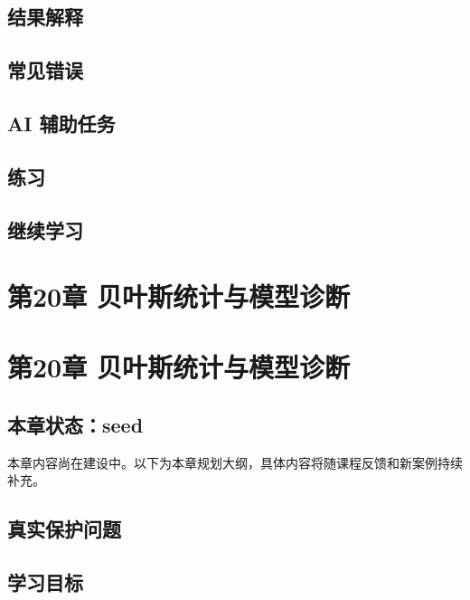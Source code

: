 \documentclass[
  letterpaper,
]{scrbook}
\begin{document}
\section{结果解释}\label{ux7ed3ux679cux89e3ux91ca-8}

\section{常见错误}\label{ux5e38ux89c1ux9519ux8bef-16}

\section{AI 辅助任务}\label{ai-ux8f85ux52a9ux4efbux52a1-9}

\section{练习}\label{ux7ec3ux4e60-18}

\section{继续学习}\label{ux7ee7ux7eedux5b66ux4e60-9}

\chapter{第20章
贝叶斯统计与模型诊断}\label{ux7b2c20ux7ae0-ux8d1dux53f6ux65afux7edfux8ba1ux4e0eux6a21ux578bux8bcaux65ad}

\chapter{第20章
贝叶斯统计与模型诊断}\label{ux7b2c20ux7ae0-ux8d1dux53f6ux65afux7edfux8ba1ux4e0eux6a21ux578bux8bcaux65ad-1}

\section{本章状态：seed}\label{ux672cux7ae0ux72b6ux6001seed-9}

本章内容尚在建设中。以下为本章规划大纲，具体内容将随课程反馈和新案例持续补充。

\section{真实保护问题}\label{ux771fux5b9eux4fddux62a4ux95eeux9898-16}

\section{学习目标}\label{ux5b66ux4e60ux76eeux6807-12}
\end{document}
